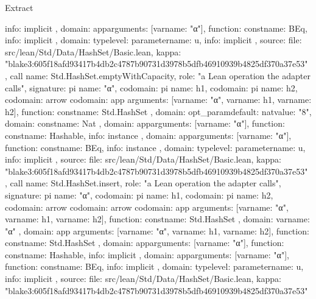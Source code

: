 \begin{lexlean}{Extract}
\begin{toolingmodule}
{{{{{            info: implicit
          },
          domain: app{arguments: [var{name: "α"}], function: const{name: BEq}},
          info: implicit
        },
        domain: type{level: parameter{name: u}},
        info: implicit
      },
      source: {
        file: src/lean/Std/Data/HashSet/Basic.lean,
        kappa: "blake3:605f18afd93417b4db2c4787b90731d3978b5dfb46910939b4825df370a37e53"
      }
    },
    call{
      name: Std.HashSet.emptyWithCapacity,
      role: "a Lean operation the adapter calls",
      signature: pi{
        name: "α",
        codomain: pi{
          name: h1,
          codomain: pi{
            name: h2,
            codomain: arrow{
              codomain: app{
                arguments: [var{name: "α"}, var{name: h1}, var{name: h2}],
                function: const{name: Std.HashSet}
              },
              domain: opt_param{default: nat{value: "8"}, domain: const{name: Nat}}
            },
            domain: app{arguments: [var{name: "α"}], function: const{name: Hashable}},
            info: instance
          },
          domain: app{arguments: [var{name: "α"}], function: const{name: BEq}},
          info: instance
        },
        domain: type{level: parameter{name: u}},
        info: implicit
      },
      source: {
        file: src/lean/Std/Data/HashSet/Basic.lean,
        kappa: "blake3:605f18afd93417b4db2c4787b90731d3978b5dfb46910939b4825df370a37e53"
      }
    },
    call{
      name: Std.HashSet.insert,
      role: "a Lean operation the adapter calls",
      signature: pi{
        name: "α",
        codomain: pi{
          name: h1,
          codomain: pi{
            name: h2,
            codomain: arrow{
              codomain: arrow{
                codomain: app{
                  arguments: [var{name: "α"}, var{name: h1}, var{name: h2}],
                  function: const{name: Std.HashSet}
                },
                domain: var{name: "α"}
              },
              domain: app{
                arguments: [var{name: "α"}, var{name: h1}, var{name: h2}],
                function: const{name: Std.HashSet}
              }
            },
            domain: app{arguments: [var{name: "α"}], function: const{name: Hashable}},
            info: implicit
          },
          domain: app{arguments: [var{name: "α"}], function: const{name: BEq}},
          info: implicit
        },
        domain: type{level: parameter{name: u}},
        info: implicit
      },
      source: {
        file: src/lean/Std/Data/HashSet/Basic.lean,
        kappa: "blake3:605f18afd93417b4db2c4787b90731d3978b5dfb46910939b4825df370a37e53"
}}}
\end{toolingmodule}
\end{lexlean}
